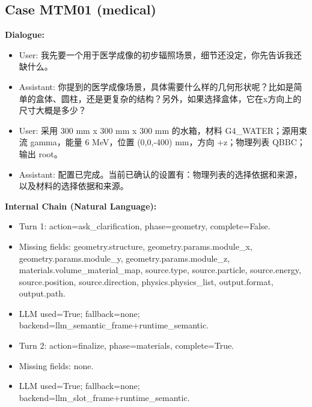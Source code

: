 \documentclass[11pt]{ctexart}
\begin{document}
\subsection{Case MTM01 (medical)}
\textbf{Dialogue:}
\begin{itemize}
\item User: 我先要一个用于医学成像的初步辐照场景，细节还没定，你先告诉我还缺什么。
\item Assistant: 你提到的医学成像场景，具体需要什么样的几何形状呢？比如是简单的盒体、圆柱，还是更复杂的结构？另外，如果选择盒体，它在x方向上的尺寸大概是多少？
\item User: 采用 300 mm x 300 mm x 300 mm 的水箱，材料 G4\_WATER；源用束流 gamma，能量 6 MeV，位置 (0,0,-400) mm，方向 +z；物理列表 QBBC；输出 root。
\item Assistant: 配置已完成。当前已确认的设置有：物理列表的选择依据和来源，以及材料的选择依据和来源。
\end{itemize}
\textbf{Internal Chain (Natural Language):}
\begin{itemize}
\item Turn 1: action=ask\_clarification, phase=geometry, complete=False.
\item Missing fields: geometry.structure, geometry.params.module\_x, geometry.params.module\_y, geometry.params.module\_z, materials.volume\_material\_map, source.type, source.particle, source.energy, source.position, source.direction, physics.physics\_list, output.format, output.path.
\item LLM used=True; fallback=none; backend=llm\_semantic\_frame+runtime\_semantic.
\item Turn 2: action=finalize, phase=materials, complete=True.
\item Missing fields: none.
\item LLM used=True; fallback=none; backend=llm\_slot\_frame+runtime\_semantic.
\end{itemize}
\end{document}

